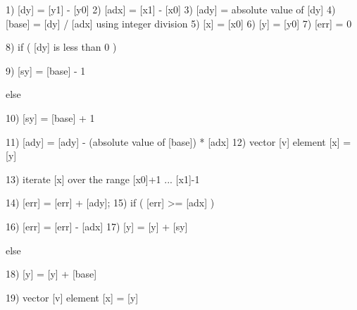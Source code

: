 \begin{programlisting}
  1)   [dy] = [y1] - [y0]
  2)  [adx] = [x1] - [x0]
  3)  [ady] = absolute value of [dy]
  4) [base] = [dy] / [adx] using integer division
  5)    [x] = [x0]
  6)    [y] = [y0]
  7)  [err] = 0

  8) if ( [dy] is less than 0 ) {

        9) [sy] = [base] - 1

     } else {

       10) [sy] = [base] + 1

     }

 11) [ady] = [ady] - (absolute value of [base]) * [adx]
 12) vector [v] element [x] = [y]

 13) iterate [x] over the range [x0]+1 ... [x1]-1 {

       14) [err] = [err] + [ady];
       15) if ( [err] >= [adx] ) {

             16) [err] = [err] - [adx]
             17)   [y] = [y] + [sy]

           } else {

             18) [y] = [y] + [base]

           }

       19) vector [v] element [x] = [y]

     }
\end{programlisting}








